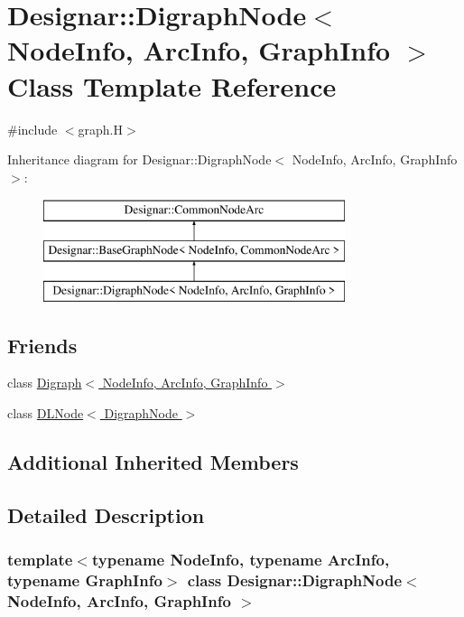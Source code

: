 \hypertarget{class_designar_1_1_digraph_node}{}\section{Designar\+:\+:Digraph\+Node$<$ Node\+Info, Arc\+Info, Graph\+Info $>$ Class Template Reference}
\label{class_designar_1_1_digraph_node}


{\ttfamily \#include $<$graph.\+H$>$}

Inheritance diagram for Designar\+:\+:Digraph\+Node$<$ Node\+Info, Arc\+Info, Graph\+Info $>$\+:\begin{figure}[H]
\begin{center}
\leavevmode
\includegraphics[height=3.000000cm]{class_designar_1_1_digraph_node}
\end{center}
\end{figure}
\subsection*{Friends}
\begin{DoxyCompactItemize}
\item 
class \hyperlink{class_designar_1_1_digraph_node_abc8f370e4ec7084a6574cf967a5a5aaf}{Digraph$<$ Node\+Info, Arc\+Info, Graph\+Info $>$}
\item 
class \hyperlink{class_designar_1_1_digraph_node_a5532eb461a543edfe19acf97b74316fc}{D\+L\+Node$<$ Digraph\+Node $>$}
\end{DoxyCompactItemize}
\subsection*{Additional Inherited Members}


\subsection{Detailed Description}
\subsubsection*{template$<$typename Node\+Info, typename Arc\+Info, typename Graph\+Info$>$\newline
class Designar\+::\+Digraph\+Node$<$ Node\+Info, Arc\+Info, Graph\+Info $>$}



